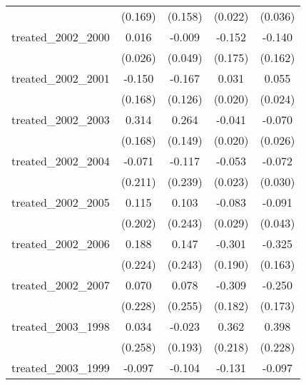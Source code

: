 {\begin{tabular}{l*{4}{c}}
            &     (0.169)         &     (0.158)         &     (0.022)         &     (0.036)         \\
[1em]
treated\_2002\_2000&       0.016         &      -0.009         &      -0.152         &      -0.140         \\
            &     (0.026)         &     (0.049)         &     (0.175)         &     (0.162)         \\
[1em]
treated\_2002\_2001&      -0.150         &      -0.167         &       0.031         &       0.055\sym{*}  \\
            &     (0.168)         &     (0.126)         &     (0.020)         &     (0.024)         \\
[1em]
treated\_2002\_2003&       0.314         &       0.264         &      -0.041\sym{*}  &      -0.070\sym{**} \\
            &     (0.168)         &     (0.149)         &     (0.020)         &     (0.026)         \\
[1em]
treated\_2002\_2004&      -0.071         &      -0.117         &      -0.053\sym{*}  &      -0.072\sym{*}  \\
            &     (0.211)         &     (0.239)         &     (0.023)         &     (0.030)         \\
[1em]
treated\_2002\_2005&       0.115         &       0.103         &      -0.083\sym{**} &      -0.091\sym{*}  \\
            &     (0.202)         &     (0.243)         &     (0.029)         &     (0.043)         \\
[1em]
treated\_2002\_2006&       0.188         &       0.147         &      -0.301         &      -0.325\sym{*}  \\
            &     (0.224)         &     (0.243)         &     (0.190)         &     (0.163)         \\
[1em]
treated\_2002\_2007&       0.070         &       0.078         &      -0.309         &      -0.250         \\
            &     (0.228)         &     (0.255)         &     (0.182)         &     (0.173)         \\
[1em]
treated\_2003\_1998&       0.034         &      -0.023         &       0.362         &       0.398         \\
            &     (0.258)         &     (0.193)         &     (0.218)         &     (0.228)         \\
[1em]
treated\_2003\_1999&      -0.097         &      -0.104         &      -0.131         &      -0.097         \\

\end{tabular}}
